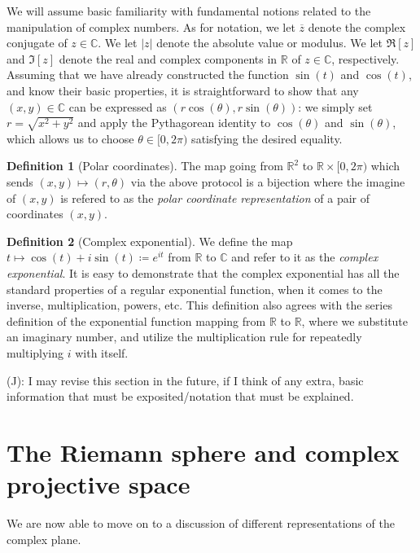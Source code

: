 \documentclass[aps,pra,showpacs,notitlepage,onecolumn,superscriptaddress,nofootinbib]{revtex4-1}
\newcommand{\jcom}[1]{\noindent\textcolor{moss}{(J): #1}}
\theoremstyle{definition}
\newtheorem{definition}{Definition}[section]
\begin{document}
We will assume basic familiarity with fundamental notions related to the manipulation of complex numbers. As for notation, we let $\overline{z}$ denote the complex conjugate of $z \in \mathbb{C}$.
We let $|z|$ denote the absolute value or modulus. We let $\Re[z]$ and $\Im[z]$ denote the real and complex components in $\mathbb{R}$ of $z \in \mathbb{C}$, respectively. Assuming that
we have already constructed the function $\sin(t)$ and $\cos(t)$, and know their basic properties, it is straightforward to show that any $(x, y) \in \mathbb{C}$ can be expressed as $(r \cos(\theta), r \sin(\theta))$:
we simply set $r = \sqrt{x^2 + y^2}$ and apply the Pythagorean identity to $\cos(\theta)$ and $\sin(\theta)$, which allows us to choose $\theta \in [0, 2\pi)$ satisfying the desired equality.

\begin{definition}[Polar coordinates]
  The map going from $\mathbb{R}^2$ to $\mathbb{R} \times [0, 2\pi)$ which sends $(x, y) \mapsto (r, \theta)$ via the above protocol is a bijection where the imagine of $(x, y)$ is refered to as the \textit{polar coordinate representation}
    of a pair of coordinates $(x, y)$.
\end{definition}

\begin{definition}[Complex exponential]
  We define the map $t \mapsto  \cos(t) + i \sin(t) \coloneqq e^{it}$ from $\mathbb{R}$ to $\mathbb{C}$ and refer to it as the \textit{complex exponential}. It is easy to demonstrate that
  the complex exponential has all the standard properties of a regular exponential function, when it comes to the inverse, multiplication, powers, etc. This definition also agrees
  with the series definition of the exponential function mapping from $\mathbb{R}$ to $\mathbb{R}$, where we substitute an imaginary number, and utilize the multiplication rule
  for repeatedly multiplying $i$ with itself.
\end{definition}

\noindent \jcom{I may revise this section in the future, if I think of any extra, basic information that must be exposited/notation that must be explained.}

\section{The Riemann sphere and complex projective space}

\noindent We are now able to move on to a discussion of different representations of the complex plane.
\end{document}
